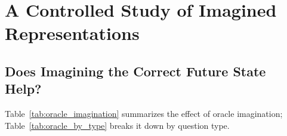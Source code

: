 \documentclass[twocolumn]{article}
\begin{document}
\section*{A Controlled Study of Imagined Representations}
\subsection*{Does Imagining the Correct Future State Help?}
Table~\ref{tab:oracle_imagination} summarizes the effect of oracle imagination;
Table~\ref{tab:oracle_by_type} breaks it down by question type.


\end{document}
